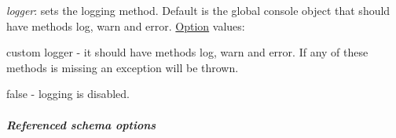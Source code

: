 \begin{DoxyItemize}
\item {\itshape logger}\+: sets the logging method. Default is the global {\ttfamily console} object that should have methods {\ttfamily log}, {\ttfamily warn} and {\ttfamily error}. \mbox{\hyperlink{structOption}{Option}} values\+:
\begin{DoxyItemize}
\item custom logger -\/ it should have methods {\ttfamily log}, {\ttfamily warn} and {\ttfamily error}. If any of these methods is missing an exception will be thrown.
\item {\ttfamily false} -\/ logging is disabled.
\end{DoxyItemize}
\end{DoxyItemize}

\subparagraph*{Referenced schema options}


